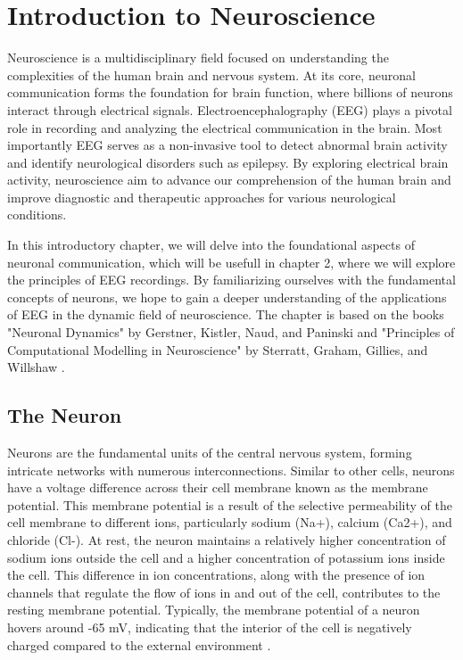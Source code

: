 \documentclass[a4paper, UKenglish, 11pt]{uiomaster}
\begin{document}
\chapter{Introduction to Neuroscience} \label{chap:intro_neuro}

Neuroscience is a multidisciplinary field focused on understanding the complexities of the human brain and nervous system. At its core, neuronal communication forms the foundation for brain function, where billions of neurons interact through electrical signals. Electroencephalography (EEG) plays a pivotal role in recording and analyzing the electrical communication in the brain. Most importantly EEG serves as a non-invasive tool to detect abnormal brain activity and identify neurological disorders such as epilepsy. By exploring electrical brain activity, neuroscience aim to advance our comprehension of the human brain and improve diagnostic and therapeutic approaches for various neurological conditions.

In this introductory chapter, we will delve into the foundational aspects of neuronal communication, which will be usefull in chapter 2, where we will explore the principles of EEG recordings. By familiarizing ourselves with the fundamental concepts of neurons, we hope to gain a deeper understanding of the applications of EEG in the dynamic field of neuroscience. The chapter is based on the books "Neuronal Dynamics" by Gerstner, Kistler, Naud, and Paninski \cite{gerstner2014neuronal} and "Principles of Computational Modelling in Neuroscience" by Sterratt, Graham, Gillies, and Willshaw \cite{sterratt2011principles}.



\section{The Neuron}

Neurons are the fundamental units of the central nervous system, forming intricate networks with numerous interconnections. Similar to other cells, neurons have a voltage difference across their cell membrane known as the membrane potential. This membrane potential is a result of the selective permeability of the cell membrane to different ions, particularly sodium (Na+), calcium (Ca2+), and chloride (Cl-). At rest, the neuron maintains a relatively higher concentration of sodium ions outside the cell and a higher concentration of potassium ions inside the cell. This difference in ion concentrations, along with the presence of ion channels that regulate the flow of ions in and out of the cell, contributes to the resting membrane potential. Typically, the membrane potential of a neuron hovers around -65 mV, indicating that the interior of the cell is negatively charged compared to the external environment \cite{sterratt2011principles}.
\end{document}
